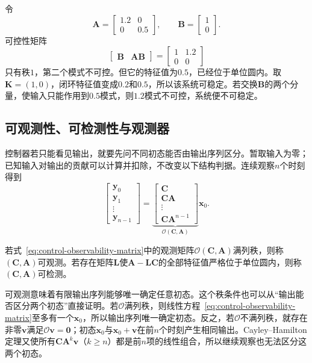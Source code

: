 \begin{example}[不可控但可稳定的系统]
\label{ex:control-stabilizable-not-controllable}
令
\[
  \bm{A}=
  \begin{bmatrix}
    1.2&0\\
    0&0.5
  \end{bmatrix},
  \qquad
  \bm{B}=
  \begin{bmatrix}
    1\\0
  \end{bmatrix}.
\]
可控性矩阵
\[
  \begin{bmatrix}\bm{B}&\bm{A}\bm{B}\end{bmatrix}
  =
  \begin{bmatrix}
    1&1.2\\
    0&0
  \end{bmatrix}
\]
只有秩$1$，第二个模式不可控。但它的特征值为$0.5$，已经位于单位圆内。取$\bm{K}=(1,0)$，闭环特征值变成$0.2$和$0.5$，所以该系统可稳定。若交换$\bm{B}$的两个分量，使输入只能作用到$0.5$模式，则$1.2$模式不可控，系统便不可稳定。
\end{example}
\subsection{可观测性、可检测性与观测器}
控制器若只能看见输出，就要先问不同初态能否由输出序列区分。暂取输入为零；已知输入对输出的贡献可以计算并扣除，不改变以下结构判据。连续观察$n$个时刻得到
\begin{equation}
  \begin{bmatrix}
    \bm{y}_0\\
    \bm{y}_1\\
    \vdots\\
    \bm{y}_{n-1}
  \end{bmatrix}
  =
  \underbrace{
  \begin{bmatrix}
    \bm{C}\\
    \bm{C}\bm{A}\\
    \vdots\\
    \bm{C}\bm{A}^{n-1}
  \end{bmatrix}}_{\mathcal{O}(\bm{C},\bm{A})}
  \bm{x}_0.
  \label{eq:control-observability-matrix}
\end{equation}
\begin{definition}[可观测性与可检测性]
\label{def:control-observability-detectability}
若式~\eqref{eq:control-observability-matrix}中的观测矩阵$\mathcal{O}(\bm{C},\bm{A})$满列秩，则称$(\bm{C},\bm{A})$可观测。若存在矩阵$\bm{L}$使$\bm{A}-\bm{L}\bm{C}$的全部特征值严格位于单位圆内，则称$(\bm{C},\bm{A})$可检测。
\end{definition}
可观测意味着有限输出序列能够唯一确定任意初态。这个秩条件也可以从“输出能否区分两个初态”直接证明。若$\mathcal{O}$满列秩，则线性方程~\eqref{eq:control-observability-matrix}至多有一个$\bm{x}_0$，所以输出序列唯一确定初态。反之，若$\mathcal{O}$不满列秩，就存在非零$\bm{v}$满足$\mathcal{O}\bm{v}=\bm{0}$；初态$\bm{x}_0$与$\bm{x}_0+\bm{v}$在前$n$个时刻产生相同输出。Cayley--Hamilton定理又使所有$\bm{C}\bm{A}^k\bm{v}$（$k\geq n$）都是前$n$项的线性组合，所以继续观察也无法区分这两个初态。

